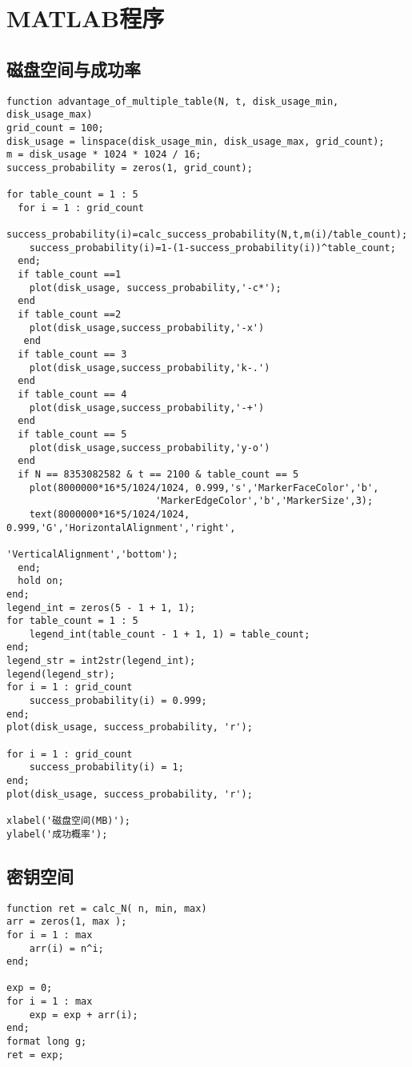 \appendix
\chapter{MATLAB程序}
\section{磁盘空间与成功率}
\begin{lstlisting}
function advantage_of_multiple_table(N, t, disk_usage_min, disk_usage_max)
grid_count = 100;
disk_usage = linspace(disk_usage_min, disk_usage_max, grid_count);
m = disk_usage * 1024 * 1024 / 16;
success_probability = zeros(1, grid_count);

for table_count = 1 : 5
  for i = 1 : grid_count
    success_probability(i)=calc_success_probability(N,t,m(i)/table_count);
    success_probability(i)=1-(1-success_probability(i))^table_count;
  end;
  if table_count ==1
    plot(disk_usage, success_probability,'-c*');
  end
  if table_count ==2
    plot(disk_usage,success_probability,'-x')
   end
  if table_count == 3
    plot(disk_usage,success_probability,'k-.')
  end
  if table_count == 4
    plot(disk_usage,success_probability,'-+')
  end
  if table_count == 5
    plot(disk_usage,success_probability,'y-o')
  end
  if N == 8353082582 & t == 2100 & table_count == 5
    plot(8000000*16*5/1024/1024, 0.999,'s','MarkerFaceColor','b',
                          'MarkerEdgeColor','b','MarkerSize',3);
    text(8000000*16*5/1024/1024, 0.999,'G','HorizontalAlignment','right',
                                           'VerticalAlignment','bottom');
  end;
  hold on;
end;
legend_int = zeros(5 - 1 + 1, 1);
for table_count = 1 : 5
	legend_int(table_count - 1 + 1, 1) = table_count;
end;
legend_str = int2str(legend_int);
legend(legend_str);
for i = 1 : grid_count
	success_probability(i) = 0.999;
end;
plot(disk_usage, success_probability, 'r');

for i = 1 : grid_count
	success_probability(i) = 1;
end;
plot(disk_usage, success_probability, 'r');

xlabel('磁盘空间(MB)');
ylabel('成功概率');
\end{lstlisting}
\section{密钥空间}
\begin{lstlisting}
function ret = calc_N( n, min, max)
arr = zeros(1, max );
for i = 1 : max
	arr(i) = n^i;
end;

exp = 0;
for i = 1 : max
	exp = exp + arr(i);
end;
format long g;
ret = exp;
\end{lstlisting}
